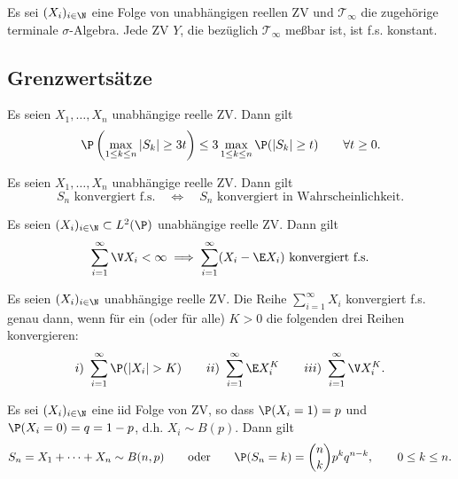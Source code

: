 \documentclass[11pt, a4paper]{article}
\begin{document}
\begin{corollary}
    Es sei $(X_i)_{i \in \N}$ eine Folge von unabhängigen reellen ZV und $\mathscr{T}_\infty$ die zugehörige terminale $\sigma$-Algebra. Jede ZV $Y$, die bezüglich $\mathscr{T}_\infty$ meßbar ist, ist f.s. konstant.
\end{corollary}


\subsection{Grenzwertsätze}


\begin{theorem} \Theorem
    Es seien $X_1, \dots, X_n$ unabhängige reelle ZV. Dann gilt
    $$\P\left(\max_{1 \le k \le n} |S_k| \ge 3t\right) \le 3 \max_{1 \le k \le n} \P(|S_k| \ge t) \qquad \forall t \ge 0.$$
\end{theorem}

\begin{theorem}[Lévy] \Theorem
    Es seien $X_1, \dots, X_n$ unabhängige reelle ZV. Dann gilt
    $$S_n \text{ konvergiert f.s.} \quad \Longleftrightarrow \quad S_n \text{ konvergiert in Wahrscheinlichkeit}.$$
\end{theorem}

\begin{corollary}
    Es seien $(X_i)_{i \in \N} \subset L^2(\P)$ unabhängige reelle ZV. Dann gilt
    $$\sum_{i=1}^{\infty} \V X_i < \infty \implies \sum_{i=1}^{\infty} (X_i - \E X_i) \text{ konvergiert f.s.}$$
\end{corollary}

\begin{theorem}
    Es seien $(X_i)_{i \in \N}$ unabhängige reelle ZV. Die Reihe $\sum_{i=1}^{\infty} X_i$ konvergiert f.s. genau dann, wenn für ein (oder für alle) $K > 0$ die folgenden drei Reihen konvergieren:
    $$ i) \ \sum_{i=1}^{\infty} \P(|X_i| > K) \qquad ii) \  \sum_{i=1}^{\infty} \E X_i^K \qquad iii) \  \sum_{i=1}^{\infty} \V X_i^K.$$
\end{theorem}

\begin{theorem} \Theorem
    Es sei $(X_i)_{i \in \N}$ eine iid Folge von ZV, so dass $\P(X_i = 1) = p$ und $\P(X_i = 0) = q = 1-p$, d.h. $X_i \sim B(p)$. Dann gilt
    $$S_n = X_1 + \dots + X_n \sim B(n,p) \qquad \text{oder} \qquad \P(S_n = k) = \binom{n}{k} p^k q^{n-k}, \qquad 0 \le k \le n.$$
\end{theorem}
\end{document}
